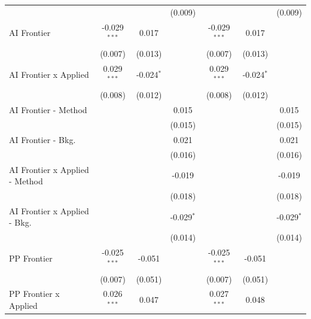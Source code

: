 \begin{tabular}{lcccccc}
                                  &                &              & (0.009)      &                &              & (0.009)\\   
   AI Frontier                    & -0.029$^{***}$ & 0.017        &              & -0.029$^{***}$ & 0.017        &   \\   
                                  & (0.007)        & (0.013)      &              & (0.007)        & (0.013)      &   \\   
   AI Frontier x Applied          & 0.029$^{***}$  & -0.024$^{*}$ &              & 0.029$^{***}$  & -0.024$^{*}$ &   \\   
                                  & (0.008)        & (0.012)      &              & (0.008)        & (0.012)      &   \\   
   AI Frontier - Method           &                &              & 0.015        &                &              & 0.015\\   
                                  &                &              & (0.015)      &                &              & (0.015)\\   
   AI Frontier - Bkg.             &                &              & 0.021        &                &              & 0.021\\   
                                  &                &              & (0.016)      &                &              & (0.016)\\   
   AI Frontier x Applied - Method &                &              & -0.019       &                &              & -0.019\\   
                                  &                &              & (0.018)      &                &              & (0.018)\\   
   AI Frontier x Applied - Bkg.   &                &              & -0.029$^{*}$ &                &              & -0.029$^{*}$\\   
                                  &                &              & (0.014)      &                &              & (0.014)\\   
   PP Frontier                    & -0.025$^{***}$ & -0.051       &              & -0.025$^{***}$ & -0.051       &   \\   
                                  & (0.007)        & (0.051)      &              & (0.007)        & (0.051)      &   \\   
   PP Frontier x Applied          & 0.026$^{***}$  & 0.047        &              & 0.027$^{***}$  & 0.048        &   \\   

\end{tabular}
